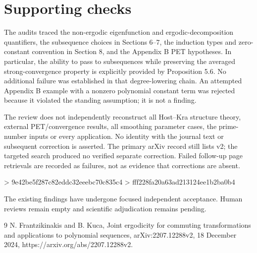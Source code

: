 \documentclass[10pt]{article}
\begin{document}
\section*{Supporting checks}
The audits traced the non-ergodic eigenfunction and ergodic-decomposition quantifiers, the subsequence choices in Sections 6–7, the induction types and zero-constant convention in Section 8, and the Appendix B PET hypotheses. In particular, the ability to pass to subsequences while preserving the averaged strong-convergence property is explicitly provided by Proposition 5.6. No additional failure was established in that degree-lowering chain. An attempted Appendix B example with a nonzero polynomial constant term was rejected because it violated the standing assumption; it is not a finding.\par
The review does not independently reconstruct all Host–Kra structure theory, external PET/convergence results, all smoothing parameter cases, the prime-number inputs or every application. No identity with the journal text or subsequent correction is asserted. The primary arXiv record still lists v2; the targeted search produced no verified separate correction. Failed follow-up page retrievals are recorded as failures, not as evidence that corrections are absent.\par
> 9e42be5f287c82eddc32eeebc70c835c4
> fff228fa20a63ad213124ee1b2ba0b4\par
The existing findings have undergone focused independent acceptance. Human reviews remain empty and scientific adjudication remains pending.\par
9 N. Frantzikinakis and B. Kuca, Joint ergodicity for commuting transformations and applications to polynomial sequences, arXiv:2207.12288v2, 18 December 2024, https://arxiv.org/abs/2207.12288v2.\par
\end{document}

